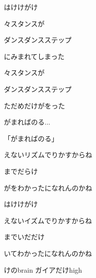 \documentclass[a4paper,tate,twocolumn,12pt]{ltjtarticle}
\begin{document}
\begin{flushleft}
\begin{minipage}{\linewidth}
はけけがけ
\end{minipage}

\vspace{2em}

\noindent\begin{minipage}{\linewidth}
々スタンスが

ダンスダンスステップ

にみまれてしまった

々スタンスが

ダンスダンスステップ

ただめだけがをった
\end{minipage}

\vspace{2em}

\noindent\begin{minipage}{\linewidth}
がまればのる...

「がまればのる」
\end{minipage}

\vspace{2em}

\noindent\begin{minipage}{\linewidth}
えないリズムでりかすからね

までだらけ

がをわかったになれんのかね

はけけがけ

えないイズムでりかすからね

までいだだけ

いてわかったになれんのかね

けのbrain ガイアだけhigh
\end{minipage}

\end{flushleft}
\end{document}
